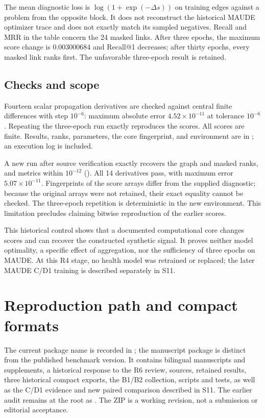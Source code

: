 \begin{table}[!htbp]\centering\small
\caption{Synthetic diagnostic of the extracted core. These are not MAUDE metrics.}

\end{table}

The mean diagnostic loss is $\log(1+\exp(-\Delta s))$ on training edges against a problem from the opposite block. It does not reconstruct the historical MAUDE optimizer trace and does not exactly match its sampled negatives. Recall and MRR in the table concern the 24 masked links. After three epochs, the maximum score change is 0.003000684 and Recall@1 decreases; after thirty epochs, every masked link ranks first. The unfavorable three-epoch result is retained.

\subsection{Checks and scope}
Fourteen scalar propagation derivatives are checked against central finite differences with step $10^{-6}$: maximum absolute error $4.52\times10^{-11}$ at tolerance $10^{-6}$. Repeating the three-epoch run exactly reproduces the scores. All scores are finite. Results, ranks, parameters, the core fingerprint, and environment are in ; an execution log is included.

A new run after source verification exactly recovers the graph and masked ranks, and metrics within $10^{-12}$ (). All 14 derivatives pass, with maximum error $5.07\times10^{-11}$. Fingerprints of the score arrays differ from the supplied diagnostic; because the original arrays were not retained, their exact equality cannot be checked. The three-epoch repetition is deterministic in the new environment. This limitation precludes claiming bitwise reproduction of the earlier scores.

This historical control shows that a documented computational core changes scores and can recover the constructed synthetic signal. It proves neither model optimality, a specific effect of aggregation, nor the sufficiency of three epochs on MAUDE. At this R4 stage, no health model was retrained or replaced; the later MAUDE C/D1 training is described separately in S11.

\par{}
\section{Reproduction path and compact formats}
\label{supp:replay}
The current package name is recorded in ; the manuscript package is distinct from the published benchmark version. It contains bilingual manuscripts and supplements, a historical response to the R6 review, sources, retained results, three historical compact exports, the B1/B2 collection, scripts and tests, as well as the C/D1 evidence and new paired comparison described in S11. The earlier audit remains at the root as . The ZIP is a working revision, not a submission or editorial acceptance.

